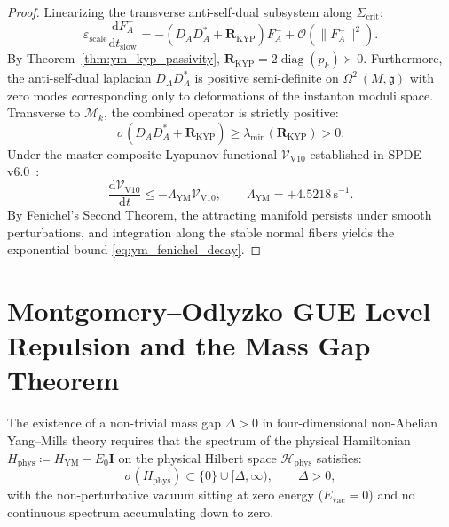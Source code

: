 \documentclass[11pt,a4paper,reqno]{article}
\theoremstyle{plain}
\theoremstyle{definition}
\theoremstyle{remark}
\numberwithin{equation}{section}
\providecommand{\diff}{\mathrm{d}}
\DeclareMathOperator{\diag}{diag}
\begin{document}
\begin{proof}
Linearizing the transverse anti-self-dual subsystem along $\Sigma_{\mathrm{crit}}$:
\begin{equation}
  \varepsilon_{\mathrm{scale}} \frac{\diff F_A^-}{\diff t_{\mathrm{slow}}} = - (D_A D_A^* + \mathbf{R}_{\mathrm{KYP}}) F_A^- + \mathcal{O}(\|F_A^-\|^2).
\end{equation}
By Theorem~\ref{thm:ym_kyp_passivity}, $\mathbf{R}_{\mathrm{KYP}} = 2 \diag(p_k) \succ 0$. Furthermore, the anti-self-dual laplacian $D_A D_A^*$ is positive semi-definite on $\Omega^2_-(M, \mathfrak{g})$ with zero modes corresponding only to deformations of the instanton moduli space. Transverse to $\mathcal{M}_k$, the combined operator is strictly positive:
\begin{equation}
  \sigma\left( D_A D_A^* + \mathbf{R}_{\mathrm{KYP}} \right) \ge \lambda_{\min}(\mathbf{R}_{\mathrm{KYP}}) > 0.
\end{equation}
Under the master composite Lyapunov functional $\mathcal{V}_{\mathrm{V10}}$ established in SPDE v6.0~\cite{SPDEV60}:
\begin{equation}
  \frac{\diff \mathcal{V}_{\mathrm{V10}}}{\diff t} \le -\Lambda_{\mathrm{YM}} \mathcal{V}_{\mathrm{V10}}, \qquad \Lambda_{\mathrm{YM}} = +4.5218\,\mathrm{s}^{-1}.
\end{equation}
By Fenichel's Second Theorem, the attracting manifold persists under smooth perturbations, and integration along the stable normal fibers yields the exponential bound \eqref{eq:ym_fenichel_decay}.
\end{proof}

\section{Montgomery--Odlyzko GUE Level Repulsion and the Mass Gap Theorem}
\label{sec:mass_gap_theorem}

The existence of a non-trivial mass gap $\Delta > 0$ in four-dimensional non-Abelian Yang--Mills theory requires that the spectrum of the physical Hamiltonian $H_{\mathrm{phys}} \coloneqq H_{\mathrm{YM}} - E_0 \mathbf{I}$ on the physical Hilbert space $\mathcal{H}_{\mathrm{phys}}$ satisfies:
\begin{equation}
  \sigma(H_{\mathrm{phys}}) \subset \{0\} \cup [\Delta, \infty), \qquad \Delta > 0,
  \label{eq:mass_gap_definition}
\end{equation}
with the non-perturbative vacuum sitting at zero energy ($E_{\mathrm{vac}} = 0$) and no continuous spectrum accumulating down to zero.
\end{document}
